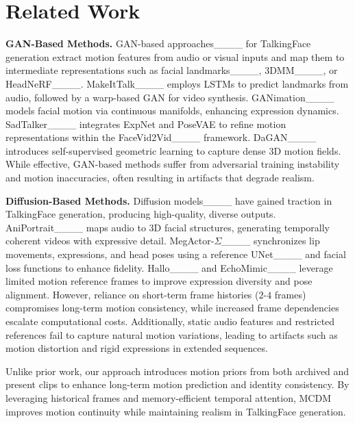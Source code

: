 \section{Related Work}
\textbf{GAN-Based Methods.}  
GAN-based approaches____ for TalkingFace generation extract motion features from audio or visual inputs and map them to intermediate representations such as facial landmarks____, 3DMM____, or HeadNeRF____. MakeItTalk____ employs LSTMs to predict landmarks from audio, followed by a warp-based GAN for video synthesis. GANimation____ models facial motion via continuous manifolds, enhancing expression dynamics. SadTalker____ integrates ExpNet and PoseVAE to refine motion representations within the FaceVid2Vid____ framework. DaGAN____ introduces self-supervised geometric learning to capture dense 3D motion fields. While effective, GAN-based methods suffer from adversarial training instability and motion inaccuracies, often resulting in artifacts that degrade realism.

\textbf{Diffusion-Based Methods.}  
Diffusion models____ have gained traction in TalkingFace generation, producing high-quality, diverse outputs. AniPortrait____ maps audio to 3D facial structures, generating temporally coherent videos with expressive detail. MegActor-$\Sigma$____ synchronizes lip movements, expressions, and head poses using a reference UNet____ and facial loss functions to enhance fidelity. Hallo____ and EchoMimic____ leverage limited motion reference frames to improve expression diversity and pose alignment. However, reliance on short-term frame histories ($2$-$4$ frames) compromises long-term motion consistency, while increased frame dependencies escalate computational costs. Additionally, static audio features and restricted references fail to capture natural motion variations, leading to artifacts such as motion distortion and rigid expressions in extended sequences.

Unlike prior work, our approach introduces motion priors from both archived and present clips to enhance long-term motion prediction and identity consistency. By leveraging historical frames and memory-efficient temporal attention, MCDM improves motion continuity while maintaining realism in TalkingFace generation.